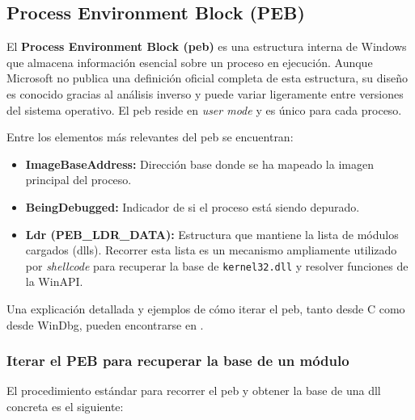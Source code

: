 \subsection{Process Environment Block (PEB)}

El \textbf{Process Environment Block (\acrshort{peb})} es una estructura interna de Windows que almacena información esencial sobre un proceso en ejecución. Aunque Microsoft no publica una definición oficial completa de esta estructura, su diseño es conocido gracias al análisis inverso y puede variar ligeramente entre versiones del sistema operativo. El \acrshort{peb} reside en \textit{user mode} y es único para cada proceso.

Entre los elementos más relevantes del \acrshort{peb} se encuentran:

\begin{itemize}
    \item \textbf{ImageBaseAddress:} Dirección base donde se ha mapeado la imagen principal del proceso.
    \item \textbf{BeingDebugged:} Indicador de si el proceso está siendo depurado.
    \item \textbf{Ldr (PEB\_LDR\_DATA):} Estructura que mantiene la lista de módulos cargados (\acrshort{dll}s).  
    Recorrer esta lista es un mecanismo ampliamente utilizado por \textit{shellcode} para recuperar la base de \texttt{kernel32.dll} y resolver funciones de la WinAPI.
\end{itemize}

Una explicación detallada y ejemplos de cómo iterar el \acrshort{peb}, tanto desde C como desde WinDbg, pueden encontrarse en \cite{nyascla_walking_peb}.

\subsubsection*{Iterar el PEB para recuperar la base de un módulo}

El procedimiento estándar para recorrer el \acrshort{peb} y obtener la base de una \acrshort{dll} concreta es el siguiente:

